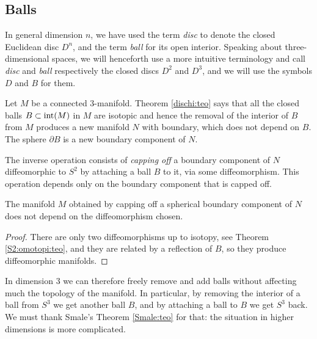 \subsection{Balls}
In general dimension $n$, we have used the term \emph{disc} to denote the closed Euclidean disc $D^n$, and the term \emph{ball} for its open interior. Speaking about three-dimensional spaces, we will henceforth use a more intuitive terminology and call \emph{disc} and \emph{ball} respectively the closed discs $D^2$ and $D^3$, and we will use the symbols $D$ and $B$ for them.

Let $M$ be a connected 3-manifold. Theorem \ref{dischi:teo} says that all the closed balls $B\subset {\rm int}(M)$ in $M$ are isotopic and hence the removal of the interior of $B$ from $M$ produces a new manifold $N$ with boundary, which does not depend on $B$. The sphere $\partial B$ is a new boundary component of $N$.

The inverse operation consists of \emph{capping off} a boundary component of $N$ diffeomorphic to $S^2$ by attaching a ball $B$ to it, via some diffeomorphism. This operation depends only on the boundary component that is capped off.

\begin{prop} \label{cap:prop}
The manifold $M$ obtained by capping off a spherical boundary component of $N$ does not depend on the diffeomorphism chosen.
\end{prop}
\begin{proof}
There are only two diffeomorphisms up to isotopy, see Theorem \ref{S2:omotopi:teo}, and they are related by a reflection of $B$, so they produce diffeomorphic manifolds.
\end{proof}

In dimension 3 we can therefore freely remove and add balls without affecting much the topology of the manifold. In particular, by removing the interior of a ball from $S^3$ we get another ball $B$, and by attaching a ball to $B$ we get $S^3$ back. We must thank Smale's Theorem \ref{Smale:teo} for that: the situation in higher dimensions is more complicated.

